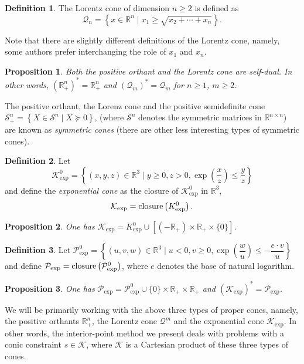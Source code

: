 \documentclass[11pt]{article}
\theoremstyle{definition}
\newtheorem{defin}{Definition}
\theoremstyle{plain}
\newtheorem{prop}{Proposition}
\begin{document}
\begin{defin}
	The \textnormal{Lorentz cone} of dimension $n\geq 2$ is defined as
	\[\mathcal{Q}_n = \left\{ x \in \mathbb{R}^n \mid x_1 \geq \sqrt{x_2+\cdots+x_n} \right\}. \]
\end{defin}
Note that there are slightly different definitions of the Lorentz cone, namely, some authors prefer interchanging the role of $x_1$ and $x_n$. \\
\begin{prop}
	Both the positive orthant and the Lorentz cone are self-dual. In other words, $(\mathbb{R}_+^n)^* = \mathbb{R}_+^n$ and $(\mathcal{Q}_m)^* = \mathcal{Q}_m$ for $n\geq 1$, $m\geq 2$.
\end{prop}
The positive orthant, the Lorenz cone and the positive semidefinite cone $\mathcal{S}^n_+ = \left\{ X \in \mathcal{S}^{n} \mid X\succeq 0 \right\}$, (where $\mathcal{S}^n$ denotes the symmetric matrices in $\mathbb{R}^{n\times n}$) are known as \textit{symmetric cones} (there are other less interesting types of symmetric cones).
\begin{defin}
	Let 
	\[\mathcal{K}^0_{\exp} = \left\{(x, y, z) \in \mathbb{R}^3 \mid y \geq 0, z > 0, \exp\left(\dfrac{x}{z}\right) \leq \dfrac{y}{z}\right\}\] 
	and define the \textit{exponential cone} as the closure of $\mathcal{K}^0_{\exp}$ in $\mathbb{R}^3$, 
	\[\mathcal{K}_{\exp} = \textnormal{closure}\left(K^0_{\exp}\right).\]
\end{defin}
\begin{prop}\label{K_exp=K0_exp_union_something}
	One has $\mathcal{K}_{\exp} = K^0_{\exp} \cup \left[\left(-\mathbb{R}_+\right) \times \mathbb{R}_+ \times \{0\} \right]$.
\end{prop}

\begin{defin}
	Let $\mathcal{P}^0_{\exp} = \left\{(u,v,w) \in \mathbb{R}^3 \mid u<0, v \geq 0, \exp\left(\dfrac{w}{u}\right)\leq -\dfrac{e\cdot v}{u} \right\}$
	and define $\mathcal{P}_{\exp} = \textnormal{closure} \left(\mathcal{P}^0_{\exp}\right)$,
	where $e$ denotes the base of natural logarithm. 
\end{defin}
\begin{prop}
	One has $\mathcal{P}_{\exp} = \mathcal{P}^0_{\exp} \cup \{0\} \times \mathbb{R}_+ \times \mathbb{R}_+$ and $ (\mathcal{K}_{\exp})^* = \mathcal{P}_{\exp}$.
\end{prop}

We will be primarily working with the above three types of proper cones, namely, the positive orthants $\mathbb{R}_+^{n}$, the Lorentz cone $\mathcal{Q}^m$ and the exponential cone $\mathcal{K}_{\exp}$. In other words, the interior-point method we present deals with problems with a conic constraint $s \in \mathcal{K}$, where $\mathcal{K}$ is a Cartesian product of these three types of cones.\\
\end{document}
